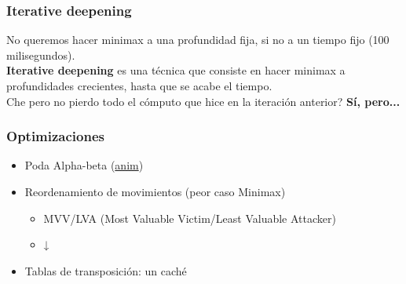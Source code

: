 \begin{frame}
\frametitle{Iterative deepening}
No queremos hacer minimax a una profundidad fija, si no a un tiempo fijo (100 milisegundos). \\
\vspace{1em}
\pause
\textbf{Iterative deepening} es una técnica que consiste en hacer minimax a profundidades crecientes, hasta que se acabe el tiempo. \\
\vspace{1em}
\pause
Che pero no pierdo todo el cómputo que hice en la iteración anterior? \pause \textbf{Sí, pero...} \\
\end{frame}

\begin{frame}
\frametitle{Optimizaciones}
\begin{itemize}
\item<1-> Poda Alpha-beta (\href{https://mlomb.dev/slides/mcts}{anim})
\item<2-> Reordenamiento de movimientos (peor caso Minimax)
\begin{itemize}
\item MVV/LVA (Most Valuable Victim/Least Valuable Attacker)
\item ↓
\end{itemize}
\item<3-> Tablas de transposición: un caché
\end{itemize}
\end{frame}
